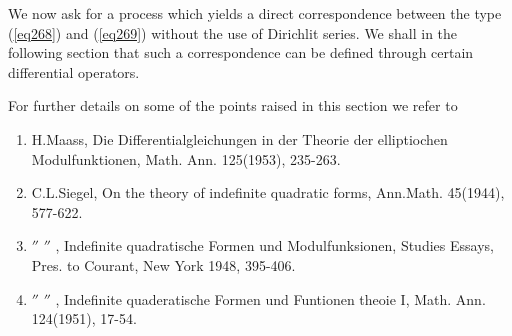 We now ask for a process which yields a direct correspondence between
\pageoriginale the type (\ref{eq268}) and (\ref{eq269}) without the
use of Dirichlit series. We  
shall in the following section that such a correspondence can be
defined through certain differential operators. 

For further details on some of the points raised in this section we
refer to  
\begin{enumerate}
\item H.Maass, Die Differentialgleichungen in der Theorie der
  elliptiochen Modulfunktionen, Math. Ann. 125(1953), 235-263. 

\item C.L.Siegel, On the theory of indefinite quadratic forms,
  Ann.\break Math. 45(1944), 577-622. 

\item $''$ \qquad $''$ , Indefinite quadratische Formen und Modulfunksionen,
  Studies Essays, Pres. to Courant, New York 1948, 395-406. 

\item $''$ \qquad $''$ , Indefinite quaderatische Formen und Funtionen
  theoie I, Math. Ann. 124(1951), 17-54. 
\end{enumerate}

